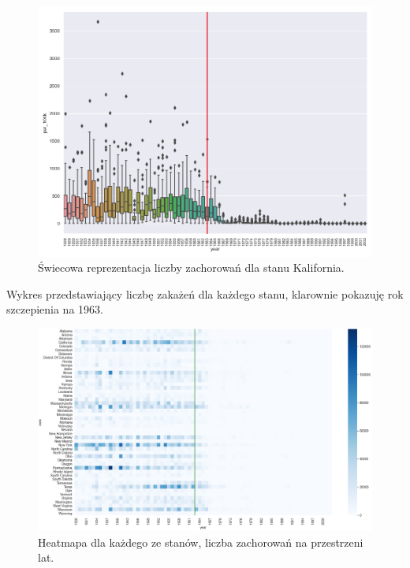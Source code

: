 \documentclass{classrep}
\begin{document}
    \begin{figure}[H]
        \centering
        \includegraphics[width=1\textwidth]{images/images1/Figure_33.png}
        \caption{Świecowa reprezentacja liczby zachorowań dla stanu Kalifornia.}
        \label{fig3a}
    \end{figure}

    Wykres przedstawiający liczbę zakażeń dla każdego stanu, klarownie pokazuję rok szczepienia na 1963.

    \begin{figure}[H]
        \centering
        \includegraphics[width=1\textwidth]{images/images1/Figure_7.png}
        \caption{Heatmapa dla każdego ze stanów, liczba zachorowań na przestrzeni lat.}
        \label{fig3b}
    \end{figure}
\end{document}
